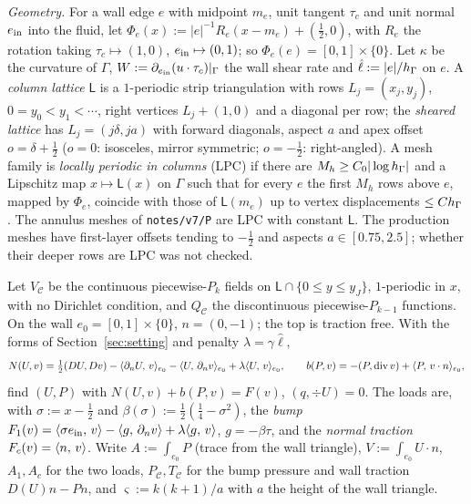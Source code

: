 \emph{Geometry.} For a wall edge $e$ with midpoint $m_e$, unit tangent $\tau_c$ and unit normal $e_{\rm in}$ into the fluid, let $\Phi_e(x):=|e|^{-1}R_e(x-m_e)+(\frac12,0)$, with $R_e$ the rotation taking $\tau_c\mapsto(1,0)$, $e_{\rm in}\mapsto(0,1)$; so $\Phi_e(e)=[0,1]\times\{0\}$. Let $\kappa$ be the curvature of $\Gamma$, $W:=\partial_{e_{\rm in}}(u\cdot\tau_c)|_\Gamma$ the wall shear rate and $\hat\ell:=|e|/h_\Gamma$ on $e$. A \emph{column lattice} $\mathsf L$ is a $1$-periodic strip triangulation with rows $L_j=(x_j,y_j)$, $0=y_0<y_1<\cdots$, right vertices $L_j+(1,0)$ and a diagonal per row; the \emph{sheared lattice} has $L_j=(j\delta,ja)$ with forward diagonals, aspect $a$ and apex offset $o=\delta+\frac12$ ($o=0$: isosceles, mirror symmetric; $o=-\frac12$: right-angled). A mesh family is \emph{locally periodic in columns} (LPC) if there are $M_h\ge C_0|\log h_\Gamma|$ and a Lipschitz map $x\mapsto\mathsf L(x)$ on $\Gamma$ such that for every $e$ the first $M_h$ rows above $e$, mapped by $\Phi_e$, coincide with those of $\mathsf L(m_e)$ up to vertex displacements $\le Ch_\Gamma$. The annulus meshes of \texttt{notes/v7/P} are LPC with constant $\mathsf L$. The production meshes have first-layer offsets tending to $-\frac12$ and aspects $a\in[0.75,2.5]$; whether their deeper rows are LPC was not checked.

\begin{definition}\label{pd:def:cell}
Let $V_{\mathcal C}$ be the continuous piecewise-$P_k$ fields on $\mathsf L\cap\{0\le y\le y_J\}$, $1$-periodic in $x$, with no Dirichlet condition, and $Q_{\mathcal C}$ the discontinuous piecewise-$P_{k-1}$ functions. On the wall $e_0=[0,1]\times\{0\}$, $n=(0,-1)$; the top is traction free. With the forms of Section~\ref{sec:setting} and penalty $\lambda=\gamma\hat\ell$,
\[
N(U,v)=\tfrac12(DU,Dv)-\langle \partial_n U,\, v\rangle_{e_0}-\langle U,\, \partial_n v\rangle_{e_0}+\lambda\langle U,\, v\rangle_{e_0},\qquad b(P,v)=-(P,\operatorname{div} v)+\langle P,\, v\cdot n\rangle_{e_0},
\]
find $(U,P)$ with $N(U,v)+b(P,v)=F(v)$, $(q,\div U)=0$. The loads are, with $\sigma:=x-\frac12$ and $\beta(\sigma):=\frac12(\frac14-\sigma^2)$, the \emph{bump} $F_1(v)=\langle \sigma e_{\rm in},\, v\rangle-\langle g,\, \partial_n v\rangle+\lambda\langle g,\, v\rangle$, $g=-\beta\tau$, and the \emph{normal traction} $F_c(v)=\langle n,\, v\rangle$. Write $A:=\int_{e_0}P$ (trace from the wall triangle), $V:=\int_{e_0}U\cdot n$, $A_1,A_c$ for the two loads, $P_{\mathcal C},T_{\mathcal C}$ for the bump pressure and wall traction $D(U)n-Pn$, and $\varsigma:=k(k+1)/a$ with $a$ the height of the wall triangle.
\end{definition}

